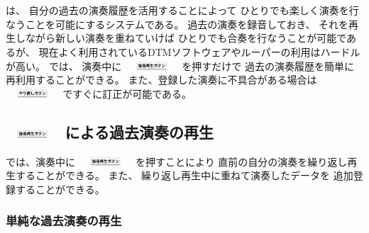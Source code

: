 %
%
\section{\system}
\label{repiano}

{\system}は、
自分の過去の演奏履歴を活用することによって
ひとりでも楽しく演奏を行なうことを可能にするシステムである。
%
過去の演奏を録音しておき、
それを再生しながら新しい演奏を重ねていけば
ひとりでも合奏を行なうことが可能であるが、
現在よく利用されているDTMソフトウェアやルーパーの利用はハードルが高い。
{\system}では、
演奏中に
\includegraphics[height=3mm,width=20mm,bb=3 23 360 80]{images/recbutton.png}
を押すだけで
過去の演奏履歴を簡単に再利用することができる。
また、登録した演奏に不具合がある場合は
\includegraphics[height=3mm,width=20mm,bb=3 23 360 80]{images/undobutton.png}
ですぐに訂正が可能である。

\subsection{\protect\includegraphics[height=3mm,width=20mm,bb=3 23 360 80]{images/recbutton.png} による過去演奏の再生}
\label{recplaybutton}

{\system}では、演奏中に
\includegraphics[height=3mm,width=20mm,bb=3 23 360 80]{images/recbutton.png}
を押すことにより
直前の自分の演奏を繰り返し再生することができる。
また、
繰り返し再生中に重ねて演奏したデータを
追加登録することができる。

\subsubsection{単純な過去演奏の再生}

